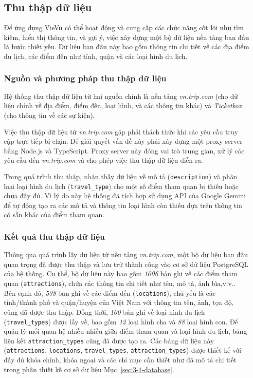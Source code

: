 \subsection{Thu thập dữ liệu}


Để ứng dụng VieVu có thể hoạt động và cung cấp các chức năng cốt lõi như tìm kiếm, hiển thị thông tin, và gợi ý, việc xây dựng một bộ dữ liệu nền tảng ban đầu là bước thiết yếu. Dữ liệu ban đầu này bao gồm thông tin chi tiết về các địa điểm du lịch, các điểm đến như tỉnh, quận và các loại hình du lịch.
\subsubsection{Nguồn và phương pháp thu thập dữ liệu}
Hệ thống thu thập dữ liệu từ hai nguồn chính là nền tảng \textit{vn.trip.com} (cho dữ liệu chính về địa điểm, điểm đến, loại hình, và các thông tin khác) và \textit{Ticketbox} (cho thông tin về các sự kiện).

Việc thu thập dữ liệu từ \textit{vn.trip.com} gặp phải thách thức khi các yêu cầu truy cập trực tiếp bị chặn. Để giải quyết vấn đề này phải xây dựng một proxy server bằng Node.js và TypeScript. Proxy server này đóng vai trò trung gian, xử lý các yêu cầu đến \textit{vn.trip.com} và cho phép việc thu thập dữ liệu diễn ra.

Trong quá trình thu thập, nhận thấy dữ liệu về mô tả (\texttt{description}) và phân loại loại hình du lịch (\texttt{travel\_type}) cho một số điểm tham quan bị thiếu hoặc chưa đầy đủ. Vì lý do này hệ thống đã tích hợp sử dụng API của Google Gemini để tự động tạo ra các mô tả và thông tin loại hình còn thiếu dựa trên thông tin có sẵn khác của điểm tham quan.

\subsubsection{Kết quả thu thập dữ liệu}
Thông qua quá trình lấy dữ liệu từ nền tảng \textit{vn.trip.com}, một bộ dữ liệu ban đầu quan trọng đã được thu thập và lưu trữ thành công vào cơ sở dữ liệu PostgreSQL của hệ thống. Cụ thể, bộ dữ liệu này bao gồm \textit{1006} bản ghi về các điểm tham quan (\texttt{attractions}), chứa các thông tin chi tiết như tên, mô tả, ảnh bìa,v.v.. Bên cạnh đó, \textit{538} bản ghi về các điểm đến (\texttt{locations}), chủ yếu là các tỉnh/thành phố và quận/huyện của Việt Nam với thông tin tên, ảnh, tọa độ, cũng đã được thu thập. Đồng thời, \textit{100} bản ghi về loại hình du lịch (\texttt{travel\_types}) được lấy về, bao gồm \textit{12} loại hình cha và \textit{88} loại hình con. Để quản lý mối quan hệ nhiều-nhiều giữa điểm tham quan và loại hình du lịch, bảng liên kết \texttt{attraction\_types} cũng đã được tạo ra. Các bảng dữ liệu này (\texttt{attractions}, \texttt{locations}, \texttt{travel\_types}, \texttt{attraction\_types}) được thiết kế với đầy đủ khóa chính, khóa ngoại và các chỉ mục cần thiết như đã mô tả chi tiết trong phần thiết kế cơ sở dữ liệu Mục~\ref{sec:3-4-database}. %

